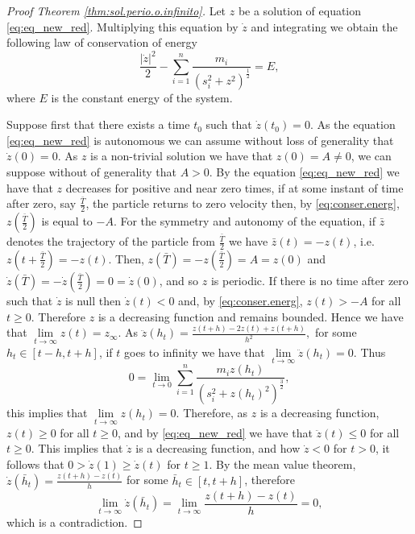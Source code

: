 \documentclass[twoside]{article}
\theoremstyle{remark}
\begin{document}
\begin{proof}[Proof  Theorem \ref{thm:sol.perio.o.infinito}]



Let $z$ be a solution of equation \eqref{eq:eq_new_red}.
Multiplying this equation by $\dot{z}$ and integrating we obtain the following law of conservation of energy
\begin{equation}\label{eq:conser.energ}
\frac{|\dot{z}|^2}{2}-\sum_{i=1}^{n} \frac{m_i}{\left(s_i^2+z^2\right)^{\frac12}}=E,
\end{equation}
where $E$ is the constant energy of the system.


Suppose first that there exists a time $t_0$ such that $\dot{z}(t_0)=0$. As the equation \eqref{eq:eq_new_red} is autonomous we can assume without loss of generality that $\dot{z}(0)=0$. As $z$ is a non-trivial solution we have that $z(0)=A\neq 0$, we can suppose without of generality that $A>0$. By the equation \eqref{eq:eq_new_red}  we have that $z$ decreases for positive and near zero times, if at some instant of time after zero, say $\frac{\bar{T}}{2}$, the particle returns to zero velocity then, by \eqref{eq:conser.energ}, $z\left(\frac{\bar{T}}{2}\right)$ is equal to $-A$. For the symmetry and autonomy of the equation, if $\bar{z}$ denotes the trajectory of the particle from  $\frac{\bar{T}}{2}$ we have $ \bar{z} (t) = - z (t) $, i.e. $z (t +\frac{\bar{T}}{2}) = -z (t)$. Then, $ z (\bar{T}) = - z \left(\frac{\bar{T}}{2}\right) = A=z(0) $ and $\dot{z} (\bar{T}) = - \dot{z} \left(\frac{\bar{T}}{2}\right) = 0 =\dot{z}(0)$, and so $z$ is periodic. If there is no time after zero such 
that $\dot{z}$ is null then $\dot{z}(t)<0$ and, by \eqref{eq:conser.energ}, $z(t)>-A$ for all $t\geq 0$. Therefore $z$ is a decreasing function and remains bounded. Hence  we have that $\lim\limits_{t\to \infty}z(t)=z_{\infty}$. As
$\ddot{z}(h_t)=\frac{z(t+h)-2z(t)+z(t+h)}{h^2},$
for some $h_t\in [t-h,t+h]$, if  $t$ goes to infinity we have that $\lim\limits_{t\to\infty}\ddot{z}(h_t)=0$.  Thus \[0=\lim\limits_{t\to 0}\sum_{i=1}^{n}\frac{m_i z(h_t)}{(s_i^2+z(h_t)^2)^{\frac32}},\] this implies that $\lim\limits_{t\to\infty}z(h_t)=0$. Therefore, as $z$ is a decreasing function,  $z(t)\geq 0$ for all $t\geq 0$, and by \eqref{eq:eq_new_red} we have that $\ddot{z}(t)\leq 0$ for all $t\geq 0$. This implies that $\dot{z}$ is a decreasing function, and how $\dot{z}< 0$ for $t>0$, it follows that $0>\dot{z}(1)\geq \dot{z}(t)$ for $t\geq 1$. By the mean value theorem, $\dot{z}(\bar{h}_t)=\frac{z(t+h)-z(t)}{h}$ for some $\bar{h}_t\in [t,t+h]$, therefore 
\[\lim\limits_{t\to \infty}\dot{z}(\bar{h}_t)=\lim\limits_{t\to \infty}\frac{z(t+h)-z(t)}{h}=0,\]
which is a contradiction.


\end{proof}
\end{document}
